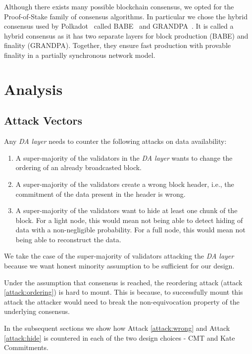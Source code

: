\documentclass[sigconf, screen=true, nonacm]{acmart}
\newcommand{\DA}{\textit{DA layer}}
\begin{document}
        Although there exists many possible blockchain consensus, we opted for the  Proof-of-Stake family of consensus algorithms. In particular we chose the hybrid consensus used by Polkadot~\cite{polkadot_consensus:2020} called BABE~\cite{BABE:2020} and GRANDPA~\cite{grandpa}. It is called a hybrid consensus as it has two separate layers for block production (BABE) and finality (GRANDPA). Together, they ensure fast production with provable finality in a partially synchronous network model. 

\section{Analysis}
    \subsection{Attack Vectors}
        Any \DA{} needs to counter the following attacks on data availability:
        \begin{enumerate}
            \item \label{attack:ordering} A super-majority of the validators in the \DA{} wants to change the ordering of an already broadcasted block.
            \item \label{attack:wrong} A super-majority of the validators create a wrong block header, i.e., the commitment of the data present in the header is wrong. 
            \item \label{attack:hide} A super-majority of the validators want to hide at least one chunk of the block. For a light node, this would mean not being able to detect hiding of data with a non-negligible probability. For a full node, this would mean not being able to reconstruct the data. 
        \end{enumerate}

        We take the case of the super-majority of validators attacking the \DA{} because we want honest minority assumption to be sufficient for our design. 
        
        Under the assumption that consensus is reached, the reordering attack (attack \ref{attack:ordering}) is hard to mount. This is because, to successfully mount this attack the attacker would need to break the non-equivocation property of the underlying consensus. 

        In the subsequent sections we show how Attack \ref{attack:wrong} and Attack \ref{attack:hide} is countered in each of the two design choices - CMT and Kate Commitments.
\end{document}
